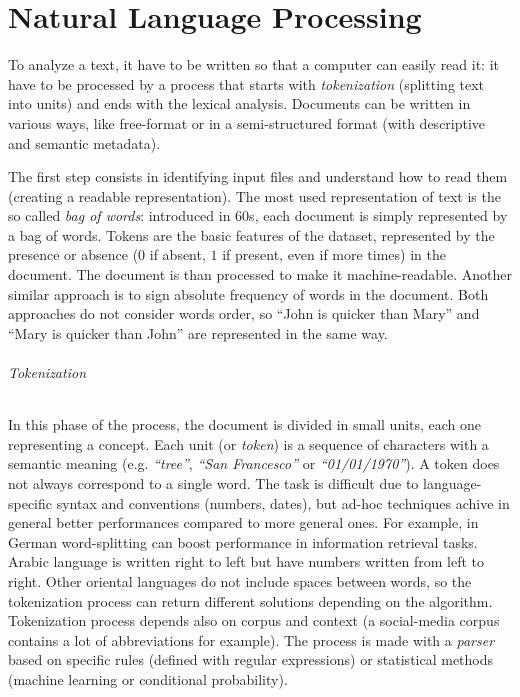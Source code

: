 \documentclass[11pt, a4page]{article}
\begin{document}
\newpage
\part{Natural Language Processing}
To analyze a text, it have to be written so that a computer can easily read it: it have to be processed by a process that starts with \textit{tokenization} (splitting text into units) and ends with the lexical analysis.
Documents can be written in various ways, like free-format or in a semi-structured format (with descriptive and semantic metadata).

The first step consists in identifying input files and understand how to read them (creating a readable representation).
The most used representation of text is the so called \textit{bag of words}: introduced in 60s, each document is simply represented by a bag of words.
Tokens are the basic features of the dataset, represented by the presence or absence ($0$ if absent, $1$ if present, even if more times) in the document.
The document is than processed to make it machine-readable.
Another similar approach is to sign absolute frequency of words in the document.
Both approaches do not consider words order, so ``John is quicker than Mary'' and ``Mary is quicker than John'' are represented in the same way.

\paragraph{Tokenization}
In this phase of the process, the document is divided in small units, each one representing a concept.
Each unit (or \textit{token}) is a sequence of characters with a semantic meaning (e.g. \textit{``tree''}, \textit{``San Francesco''} or \textit{``01/01/1970''}).
A token does not always correspond to a single word.
The task is difficult due to language-specific syntax and conventions (numbers, dates), but ad-hoc techniques achive in general better performances compared to more general ones.
For example, in German word-splitting can boost performance in information retrieval tasks. 
Arabic language is written right to left but have numbers written from left to right.
Other oriental languages do not include spaces between words, so the tokenization process can return different solutions depending on the algorithm.
Tokenization process depends also on corpus and context (a social-media corpus contains a lot of abbreviations for example). \newline
The process is made with a \textit{parser} based on specific rules (defined with regular expressions) or statistical methods (machine learning or conditional probability).
\end{document}

